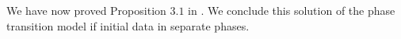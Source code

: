 \documentclass[10pt]{article}
\numberwithin{equation}{section}
\begin{document}

We have now proved Proposition $3.1$ in \cite{Colombo2003}. We conclude this solution of the phase transition model if initial data in separate phases. 
\end{document}
